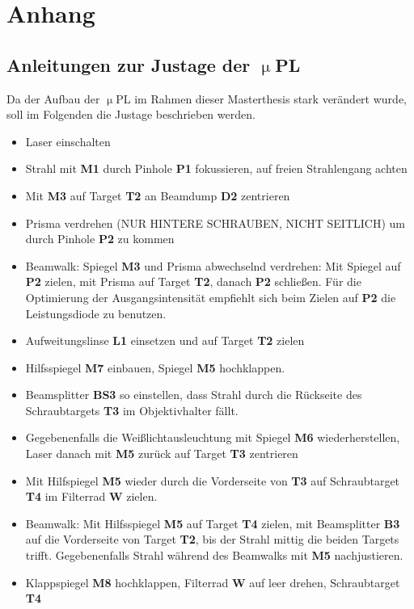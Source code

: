\chapter{Anhang} \section{Anleitungen zur Justage der \( \upmu \)PL}\label{Justage}
Da der Aufbau der \( \upmu \)PL im Rahmen dieser Masterthesis stark verändert wurde,
soll im Folgenden die Justage beschrieben werden. \begin{itemize} \item Laser
einschalten \item Strahl mit \textbf{M1} durch Pinhole \textbf{P1} fokussieren,
auf freien Strahlengang achten \item Mit \textbf{M3} auf Target \textbf{T2} an
Beamdump \textbf{D2} zentrieren \item Prisma verdrehen (NUR HINTERE SCHRAUBEN,
NICHT SEITLICH) um durch Pinhole \textbf{P2} zu kommen \item Beamwalk: Spiegel
\textbf{M3} und Prisma abwechselnd verdrehen: Mit Spiegel auf \textbf{P2}
zielen, mit Prisma auf Target \textbf{T2}, danach \textbf{P2} schließen. Für die
Optimierung der Ausgangsintensität empfiehlt sich  beim Zielen auf \textbf{P2}
die Leistungsdiode zu benutzen. \item Aufweitungslinse \textbf{L1} einsetzen und
auf Target \textbf{T2} zielen \item Hilfsspiegel \textbf{M7} einbauen, Spiegel
\textbf{M5} hochklappen. \item Beamsplitter \textbf{BS3} so einstellen, dass
Strahl durch die Rückseite des Schraubtargets \textbf{T3} im Objektivhalter
fällt. \item Gegebenenfalls die Weißlichtausleuchtung mit Spiegel \textbf{M6}
wiederherstellen, Laser danach mit \textbf{M5} zurück auf Target \textbf{T3}
zentrieren  \item Mit Hilfspiegel \textbf{M5} wieder durch die Vorderseite von
\textbf{T3} auf Schraubtarget \textbf{T4} im Filterrad \textbf{W} zielen. \item
Beamwalk: Mit Hilfsspiegel \textbf{M5} auf Target \textbf{T4} zielen, mit
Beamsplitter \textbf{B3} auf die Vorderseite von Target \textbf{T2}, bis der
Strahl mittig die beiden Targets trifft. Gegebenenfalls Strahl während des
Beamwalks mit \textbf{M5} nachjustieren. \item Klappspiegel \textbf{M8}
hochklappen, Filterrad \textbf{W} auf leer drehen, Schraubtarget \textbf{T4}

\end{itemize}
